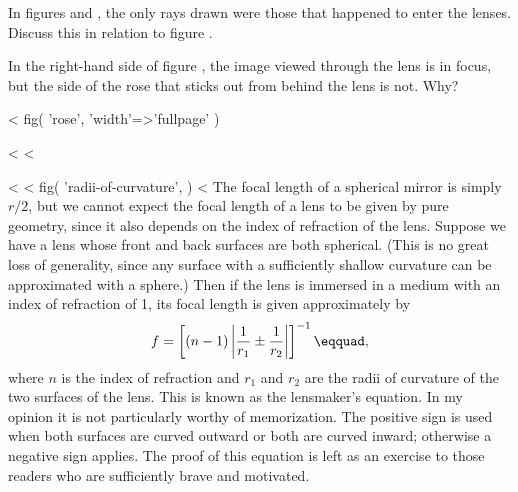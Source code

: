 \begin{dq}
In figures  and , the only rays drawn were those
that happened to enter the lenses. Discuss this in
relation to figure .
\end{dq}

\begin{dq}\label{dq:rose-image-focus}
In the right-hand side of figure , the image viewed
through the lens is in focus, but the side of the rose that
sticks out from behind the lens is not. Why?
\end{dq}

<%
  fig(
    'rose',
    {
      'width'=>'fullpage'
    }
  )

<%
<%

<%
<%
  fig(
    'radii-of-curvature',
  )
<%
The focal length of a spherical mirror is simply $r/2$, but
we cannot expect the focal length of a lens to be given by
pure geometry, since it also depends on the index of
refraction of the lens. Suppose we have a lens whose front
and back surfaces are both spherical. (This is no great loss
of generality, since any surface with a sufficiently shallow
curvature can be approximated with a sphere.) Then if the
lens is immersed in a medium with an index of refraction of
1, its focal length is given approximately by
\begin{equation*}
 f = \left[(n-1)\left|\frac{1}{r_1}\pm\frac{1}{r_2}\right|\right]^{-1}\eqquad,
\end{equation*}
where $n$ is the index of refraction and $r_1$ and $r_2$ are
the radii of curvature of the two surfaces of the lens. This
is known as the lensmaker's equation. In my opinion it is
not particularly worthy of memorization. The positive sign
is used when both surfaces are curved outward or both are
curved inward; otherwise a negative sign applies. The proof
of this equation is left as an exercise to those readers who
are sufficiently brave and motivated.

